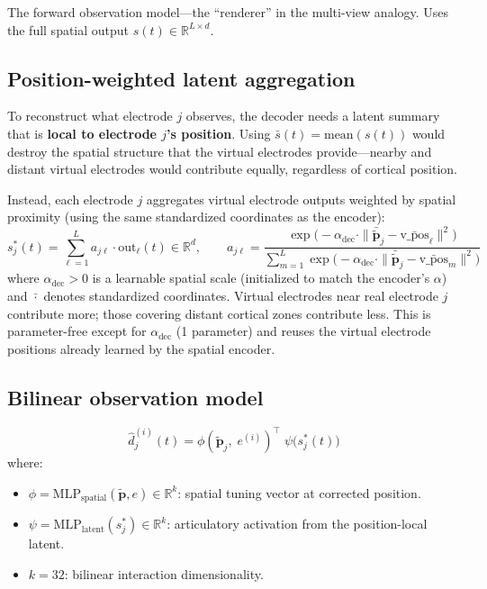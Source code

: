 \documentclass[11pt,letterpaper]{article}
\newcommand{\bfp}{\mathbf{p}}
\newcommand{\R}{\mathbb{R}}
\begin{document}
The forward observation model---the ``renderer'' in the multi-view analogy. Uses the full spatial output $s(t) \in \R^{L \times d}$.

\subsection{Position-weighted latent aggregation}

To reconstruct what electrode $j$ observes, the decoder needs a latent summary that is \textbf{local to electrode $j$'s position}. Using $\bar{s}(t) = \text{mean}(s(t))$ would destroy the spatial structure that the virtual electrodes provide---nearby and distant virtual electrodes would contribute equally, regardless of cortical position.

Instead, each electrode $j$ aggregates virtual electrode outputs weighted by spatial proximity (using the same standardized coordinates as the encoder):
\begin{equation}\label{eq:local-agg}
s_j^*(t) = \sum_{\ell=1}^{L} a_{j\ell} \cdot \text{out}_\ell(t) \in \R^d, \qquad
a_{j\ell} = \frac{\exp\bigl(-\alpha_{\text{dec}} \cdot \|\bar{\tilde{\bfp}}_j - \bar{\text{v\_pos}}_\ell\|^2\bigr)}
             {\sum_{m=1}^L \exp\bigl(-\alpha_{\text{dec}} \cdot \|\bar{\tilde{\bfp}}_j - \bar{\text{v\_pos}}_m\|^2\bigr)}
\end{equation}
where $\alpha_{\text{dec}} > 0$ is a learnable spatial scale (initialized to match the encoder's $\alpha$) and $\bar{\cdot}$ denotes standardized coordinates.
Virtual electrodes near real electrode $j$ contribute more; those covering distant cortical zones contribute less.
This is parameter-free except for $\alpha_{\text{dec}}$ (1 parameter) and reuses the virtual electrode positions already learned by the spatial encoder.

\subsection{Bilinear observation model}

\begin{equation}\label{eq:bilinear}
\boxed{\hat{d}_j^{(i)}(t) = \phi(\tilde{\bfp}_j,\; e^{(i)})^\top \;\psi\bigl(s_j^*(t)\bigr)}
\end{equation}
where:
\begin{itemize}[leftmargin=2em]
\item $\phi = \text{MLP}_{\text{spatial}}(\tilde{\bfp}, e) \in \R^k$: spatial tuning vector at corrected position.
\item $\psi = \text{MLP}_{\text{latent}}(s_j^*) \in \R^k$: articulatory activation from the position-local latent.
\item $k = 32$: bilinear interaction dimensionality.
\end{itemize}
\end{document}
